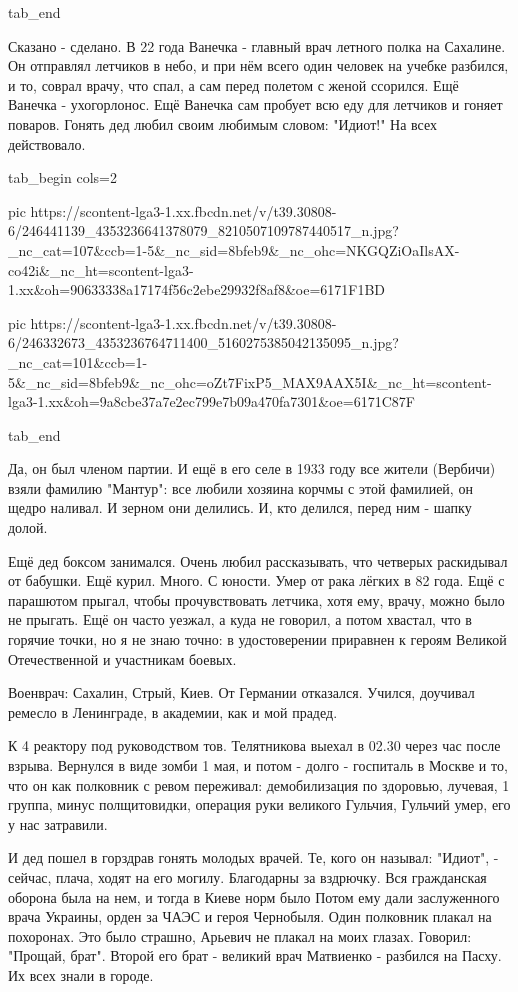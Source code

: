  tab_end
\fi

Сказано - сделано. В 22 года Ванечка - главный врач летного полка на Сахалине.
Он отправлял летчиков в небо, и при нём всего один человек на учебке разбился,
и то, соврал врачу, что спал, а сам перед полетом с женой ссорился. Ещё Ванечка
- ухогорлонос. Ещё Ванечка сам пробует всю еду для летчиков и гоняет поваров.
Гонять дед любил своим любимым словом: "Идиот!" На всех действовало. 

\ifcmt
  tab_begin cols=2

     pic https://scontent-lga3-1.xx.fbcdn.net/v/t39.30808-6/246441139_4353236641378079_8210507109787440517_n.jpg?_nc_cat=107&ccb=1-5&_nc_sid=8bfeb9&_nc_ohc=NKGQZiOaIlsAX-co42i&_nc_ht=scontent-lga3-1.xx&oh=90633338a17174f56c2ebe29932f8af8&oe=6171F1BD

     pic https://scontent-lga3-1.xx.fbcdn.net/v/t39.30808-6/246332673_4353236764711400_5160275385042135095_n.jpg?_nc_cat=101&ccb=1-5&_nc_sid=8bfeb9&_nc_ohc=oZt7FixP5_MAX9AAX5I&_nc_ht=scontent-lga3-1.xx&oh=9a8cbe37a7e2ec799e7b09a470fa7301&oe=6171C87F

  tab_end
\fi

Да, он был членом партии. И ещё в его селе в 1933 году все жители (Вербичи)
взяли фамилию "Мантур": все любили хозяина корчмы с этой фамилией, он щедро
наливал. И зерном они делились. И, кто делился, перед ним - шапку долой. 

Ещё дед боксом занимался. Очень любил рассказывать, что четверых раскидывал от
бабушки. Ещё курил. Много. С юности. Умер от рака лёгких в 82 года. Ещё с
парашютом прыгал, чтобы прочувствовать летчика, хотя ему, врачу, можно было не
прыгать. Ещё он часто уезжал, а куда не говорил, а потом хвастал, что в горячие
точки, но я не знаю точно: в удостоверении приравнен к героям Великой
Отечественной и участникам боевых.

Военврач: Сахалин, Стрый, Киев. От Германии отказался. Учился, доучивал ремесло
в Ленинграде, в академии, как и мой прадед.

К 4 реактору под руководством тов. Телятникова выехал в 02.30 через час после
взрыва. Вернулся в виде зомби 1 мая, и потом - долго - госпиталь в Москве и
то, что он как полковник с ревом переживал: демобилизация по здоровью,
лучевая, 1 группа, минус полщитовидки, операция руки великого Гульчия, Гульчий
умер, его у нас затравили. 

И дед пошел в горздрав гонять молодых врачей. Те, кого он называл: "Идиот", -
сейчас, плача, ходят на его могилу. Благодарны за вздрючку. Вся гражданская
оборона была на нем, и тогда в Киеве норм было  Потом ему дали заслуженного
врача Украины, орден за ЧАЭС и героя Чернобыля. Один полковник плакал на
похоронах. Это было страшно, Арьевич не плакал на моих глазах. Говорил:
"Прощай, брат". Второй его брат - великий врач Матвиенко - разбился на Пасху.
Их всех знали в городе.

